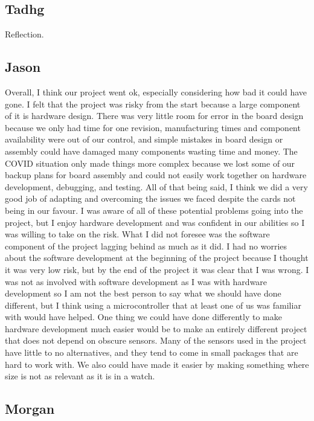 \subsection{Tadhg}

Reflection.

\subsection{Jason}

Overall, I think our project went ok, especially considering how bad it could
have gone. I felt that the project was risky from the start because a large
component of it is hardware design. There was very little room for error in the
board design because we only had time for one revision, manufacturing times
and component availability were out of our control, and simple mistakes in board 
design or assembly could have damaged many components wasting time and money. 
The COVID situation only made things more complex because we lost some of our 
backup plans for board assembly and could not easily work together on hardware 
development, debugging, and testing. All of that being said, I think we did a 
very good job of adapting and overcoming the issues we faced despite the cards 
not being in our favour. I was aware of all of these potential problems going
into the project, but I enjoy hardware development and was confident in our 
abilities so I was willing to take on the risk. What I did not foresee was the
software component of the project lagging behind as much as it did. I had no
worries about the software development at the beginning of the project 
because I thought it was very low risk, but by the end of the project it was
clear that I was wrong. I was not as involved with software development as I was
with hardware development so I am not the best person to say what we should 
have done different, but I think using a microcontroller that at least one of us
was familiar with would have helped. One thing we could have done differently to 
make hardware development much easier would be to make an entirely different 
project that does not depend on obscure sensors. Many of the sensors used in the 
project have little to no alternatives, and they tend to come in small packages 
that are hard to work with. We also could have made it easier by making 
something where size is not as relevant as it is in a watch.

\subsection{Morgan}

